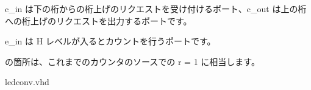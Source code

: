 \documentclass[letterpaper,10pt,dvipdfmx]{sphinxmanual}
\begin{document}
c\_in は下の桁からの桁上げのリクエストを受け付けるポート、c\_out は上の桁への桁上げのリクエストを出力するポートです。

e\_in は H レベルが入るとカウントを行うポートです。

\begin{sphinxVerbatim}[commandchars=\\\{\}]
        
\end{sphinxVerbatim}

の箇所は、これまでのカウンタのソースでの r = \textquotesingle{}1\textquotesingle{} に相当します。

ledconv.vhd
\end{document}
